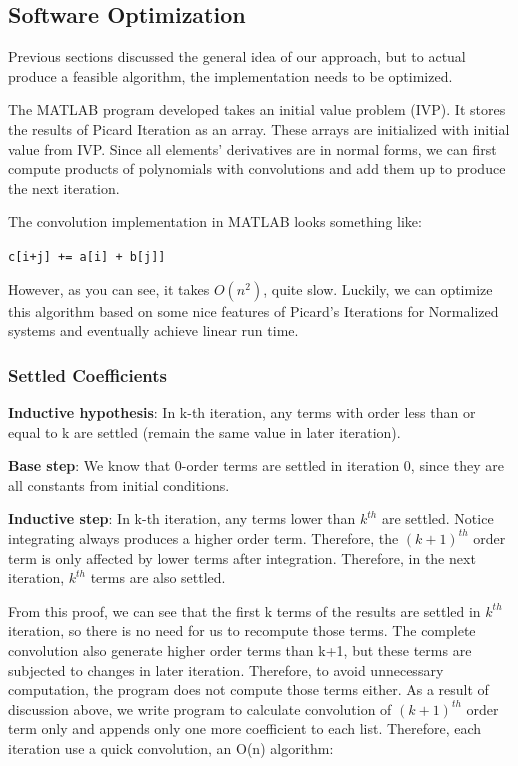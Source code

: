 \documentclass[12pt]{article}
\begin{document}
\subsection{Software Optimization}
Previous sections discussed the general idea of our approach, but to actual produce a feasible algorithm, the implementation needs to be optimized.

The MATLAB program developed takes an initial value problem (IVP).
It stores the results of Picard Iteration as an array. These arrays are initialized with initial value from IVP. Since all elements' derivatives are in normal forms, we can first compute products of polynomials with convolutions and add them up to produce the next iteration.

The convolution implementation in MATLAB looks something like:
\begin{algorithmic}
      \State \texttt{c[i+j] += a[i] + b[j]]}
   \EndFor
\EndFor
\end{algorithmic}
However, as you can see, it takes $O(n^2)$, quite slow. Luckily, we can optimize this algorithm based on some nice features of Picard's Iterations for Normalized systems and eventually achieve linear run time.

\subsubsection{Settled Coefficients}

\noindent \textbf{Inductive hypothesis}:
In k-th iteration, any terms with order less than or equal to k are settled (remain the same value in later iteration).

\noindent \textbf{Base step}:
We know that 0-order terms are settled in iteration 0, since they are all constants from initial conditions.

\noindent \textbf{Inductive step}: 
In k-th iteration, any terms lower than $k^{th}$ are settled.
Notice integrating always produces a higher order term. Therefore, the $(k+1)^{th}$ order term is only affected by lower terms after integration. Therefore, in the next iteration, $k^{th}$ terms are also settled. 
\vspace{5mm}

From this proof, we can see that the first k terms of the results are settled in $k^{th}$ iteration, so there is no need for us to recompute those terms. The complete convolution also generate higher order terms than k+1, but these terms are subjected to changes in later iteration. Therefore, to avoid unnecessary computation, the program does not compute those terms either. As a result of discussion above, we write program to calculate convolution of $(k+1)^{th}$ order term only and appends only one more coefficient to each list. Therefore, each iteration use a quick convolution, an O(n) algorithm:
\end{document}
